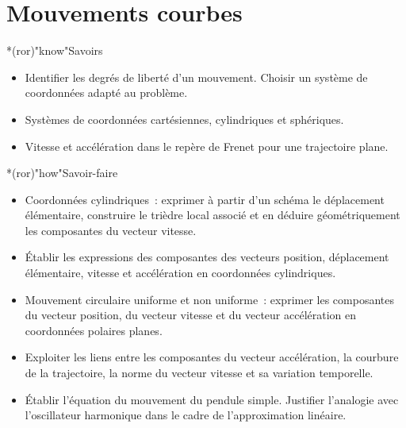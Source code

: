 \documentclass[../../main/main.tex]{subfiles}
\begin{document}
\setcounter{chapter}{2}

\chapter{Mouvements courbes}

\vfill

\begin{prgm}
	\begin{tcb}*(ror)"know"{Savoirs}
		\begin{itemize}
			\item Identifier les degrés de liberté d'un mouvement. Choisir un système
			      de coordonnées adapté au problème.

			\item Systèmes de coordonnées cartésiennes, cylindriques et sphériques.

			\item Vitesse et accélération dans le repère de Frenet pour une
			      trajectoire plane.
		\end{itemize}
	\end{tcb}
	\begin{tcb}*(ror)"how"{Savoir-faire}
		\begin{itemize}
			\item Coordonnées cylindriques~: exprimer à partir d'un schéma le
			      déplacement élémentaire, construire le trièdre local associé et en
			      déduire géométriquement les composantes du vecteur vitesse.

			\item Établir les expressions des composantes des vecteurs position,
			      déplacement élémentaire, vitesse et accélération en coordonnées
			      cylindriques.

			\item Mouvement circulaire uniforme et non uniforme~: exprimer les
			      composantes du vecteur position, du vecteur vitesse et du vecteur
			      accélération en coordonnées polaires planes.

			\item Exploiter les liens entre les composantes du vecteur accélération,
			      la courbure de la trajectoire, la norme du vecteur vitesse et sa
			      variation temporelle.

			\item Établir l’équation du mouvement du pendule simple. Justifier
			      l’analogie avec l'oscillateur harmonique dans le cadre de
			      l'approximation linéaire.
		\end{itemize}
	\end{tcb}
\end{prgm}
\end{document}
